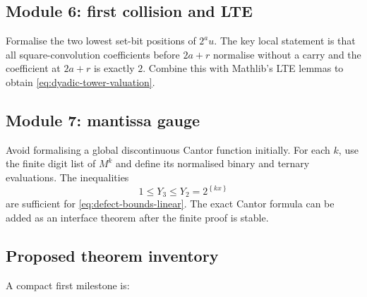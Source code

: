\documentclass[11pt]{article}
\theoremstyle{definition}
\theoremstyle{remark}
\newcommand{\fracpart}[1]{\left\{#1\right\}}
\begin{document}
\subsection{Module 6: first collision and LTE}

Formalise the two lowest set-bit positions of $2^au$.  The key local statement
is that all square-convolution coefficients before $2a+r$ normalise without a
carry and the coefficient at $2a+r$ is exactly $2$.  Combine this with
Mathlib's LTE lemmas to obtain \eqref{eq:dyadic-tower-valuation}.

\subsection{Module 7: mantissa gauge}

Avoid formalising a global discontinuous Cantor function initially.  For each
$k$, use the finite digit list of $M^k$ and define its normalised binary and
ternary evaluations.  The inequalities
\[
  1\le Y_3\le Y_2=2^{\fracpart{kx}}
\]
are sufficient for \eqref{eq:defect-bounds-linear}.  The exact Cantor formula
can be added as an interface theorem after the finite proof is stable.

\subsection{Proposed theorem inventory}

A compact first milestone is:
\end{document}
